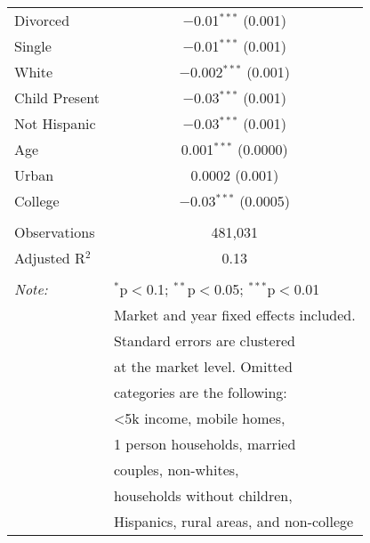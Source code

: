 \begin{table}[!htbp]
\begin{tabular}{@{\extracolsep{5pt}}lc}
  Divorced & $-$0.01$^{***}$ (0.001) \\ 
  Single & $-$0.01$^{***}$ (0.001) \\ 
  White & $-$0.002$^{***}$ (0.001) \\ 
  Child Present & $-$0.03$^{***}$ (0.001) \\ 
  Not Hispanic & $-$0.03$^{***}$ (0.001) \\ 
  Age & 0.001$^{***}$ (0.0000) \\ 
  Urban & 0.0002 (0.001) \\ 
  College & $-$0.03$^{***}$ (0.0005) \\ 
 \hline \\[-1.8ex] 
Observations & 481,031 \\ 
Adjusted R$^{2}$ & 0.13 \\ 
\hline 
\hline \\[-1.8ex] 
\textit{Note:}  & \multicolumn{1}{l}{$^{*}$p$<$0.1; $^{**}$p$<$0.05; $^{***}$p$<$0.01} \\ 
 & \multicolumn{1}{l}{Market and year fixed effects included. } \\ 
 & \multicolumn{1}{l}{Standard errors are clustered} \\ 
 & \multicolumn{1}{l}{at the market level. Omitted } \\ 
 & \multicolumn{1}{l}{categories are the following: } \\ 
 & \multicolumn{1}{l}{<5k income, mobile homes, } \\ 
 & \multicolumn{1}{l}{1 person households, married } \\ 
 & \multicolumn{1}{l}{couples, non-whites, } \\ 
 & \multicolumn{1}{l}{households without children, } \\ 
 & \multicolumn{1}{l}{Hispanics, rural areas, and non-college} \\ 
\end{tabular} 
\end{table} 
